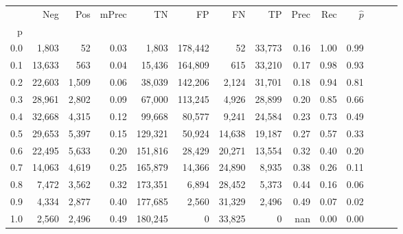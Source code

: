 \begin{tabular}{rrrrrrrrrrrrrr}
\toprule
{} &     Neg &    Pos & mPrec &       TN &       FP &      FN &      TP &  Prec &   Rec & $\hat{p}$ \\
p   &         &        &       &          &          &         &         &       &       &           \\
\midrule
0.0 &   1,803 &     52 &  0.03 &    1,803 &  178,442 &      52 &  33,773 &  0.16 &  1.00 &      0.99 \\
0.1 &  13,633 &    563 &  0.04 &   15,436 &  164,809 &     615 &  33,210 &  0.17 &  0.98 &      0.93 \\
0.2 &  22,603 &  1,509 &  0.06 &   38,039 &  142,206 &   2,124 &  31,701 &  0.18 &  0.94 &      0.81 \\
0.3 &  28,961 &  2,802 &  0.09 &   67,000 &  113,245 &   4,926 &  28,899 &  0.20 &  0.85 &      0.66 \\
0.4 &  32,668 &  4,315 &  0.12 &   99,668 &   80,577 &   9,241 &  24,584 &  0.23 &  0.73 &      0.49 \\
0.5 &  29,653 &  5,397 &  0.15 &  129,321 &   50,924 &  14,638 &  19,187 &  0.27 &  0.57 &      0.33 \\
0.6 &  22,495 &  5,633 &  0.20 &  151,816 &   28,429 &  20,271 &  13,554 &  0.32 &  0.40 &      0.20 \\
0.7 &  14,063 &  4,619 &  0.25 &  165,879 &   14,366 &  24,890 &   8,935 &  0.38 &  0.26 &      0.11 \\
0.8 &   7,472 &  3,562 &  0.32 &  173,351 &    6,894 &  28,452 &   5,373 &  0.44 &  0.16 &      0.06 \\
0.9 &   4,334 &  2,877 &  0.40 &  177,685 &    2,560 &  31,329 &   2,496 &  0.49 &  0.07 &      0.02 \\
1.0 &   2,560 &  2,496 &  0.49 &  180,245 &        0 &  33,825 &       0 &   nan &  0.00 &      0.00 \\
\bottomrule
\end{tabular}
